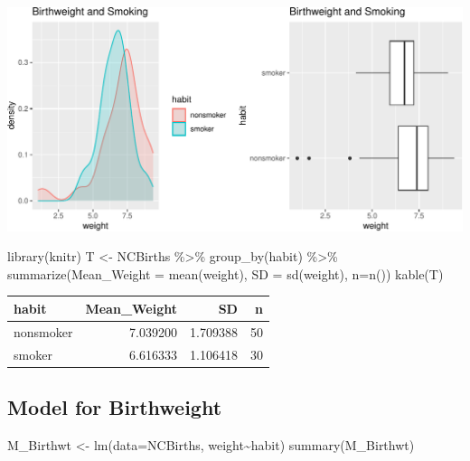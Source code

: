 \documentclass[
  letterpaper,
  DIV=11,
  numbers=noendperiod]{scrreprt}
\newenvironment{Shaded}{\begin{snugshade}}{\end{snugshade}}
\newcommand{\AttributeTok}[1]{\textcolor[rgb]{0.40,0.45,0.13}{#1}}
\newcommand{\FunctionTok}[1]{\textcolor[rgb]{0.28,0.35,0.67}{#1}}
\newcommand{\NormalTok}[1]{\textcolor[rgb]{0.00,0.23,0.31}{#1}}
\newcommand{\OtherTok}[1]{\textcolor[rgb]{0.00,0.23,0.31}{#1}}
\newcommand{\SpecialCharTok}[1]{\textcolor[rgb]{0.37,0.37,0.37}{#1}}
\begin{document}
\includegraphics{Ch4_files/figure-pdf/unnamed-chunk-101-1.pdf}

\begin{Shaded}
\begin{Highlighting}[]
\FunctionTok{library}\NormalTok{(knitr)}
\NormalTok{T }\OtherTok{\textless{}{-}}\NormalTok{ NCBirths }\SpecialCharTok{\%\textgreater{}\%} \FunctionTok{group\_by}\NormalTok{(habit) }\SpecialCharTok{\%\textgreater{}\%} \FunctionTok{summarize}\NormalTok{(}\AttributeTok{Mean\_Weight =} \FunctionTok{mean}\NormalTok{(weight), }\AttributeTok{SD =} \FunctionTok{sd}\NormalTok{(weight), }\AttributeTok{n=}\FunctionTok{n}\NormalTok{())}
\FunctionTok{kable}\NormalTok{(T)}
\end{Highlighting}
\end{Shaded}

\begin{longtable}[]{@{}lrrr@{}}
\toprule\noalign{}
habit & Mean\_Weight & SD & n \\
\midrule\noalign{}
\endhead
\bottomrule\noalign{}
\endlastfoot
nonsmoker & 7.039200 & 1.709388 & 50 \\
smoker & 6.616333 & 1.106418 & 30 \\
\end{longtable}

\subsection{Model for Birthweight}\label{model-for-birthweight}

\begin{Shaded}
\begin{Highlighting}[]
\NormalTok{M\_Birthwt }\OtherTok{\textless{}{-}} \FunctionTok{lm}\NormalTok{(}\AttributeTok{data=}\NormalTok{NCBirths, weight}\SpecialCharTok{\textasciitilde{}}\NormalTok{habit)}
\FunctionTok{summary}\NormalTok{(M\_Birthwt)}
\end{Highlighting}
\end{Shaded}
\end{document}
